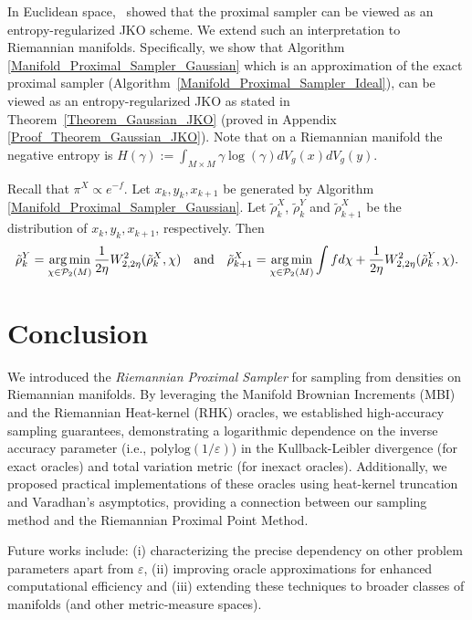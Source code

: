 In Euclidean space,~\cite{chen2022improved} showed that the proximal sampler can be viewed as an entropy-regularized JKO scheme.
We extend such an interpretation to Riemannian manifolds. Specifically, we show that Algorithm \ref{Manifold_Proximal_Sampler_Gaussian} which is an approximation of the exact proximal sampler (Algorithm~\ref{Manifold_Proximal_Sampler_Ideal}), can be viewed as an entropy-regularized JKO as stated in Theorem~\ref{Theorem_Gaussian_JKO} (proved in Appendix \ref{Proof_Theorem_Gaussian_JKO}). Note that on a Riemannian manifold the negative entropy is $H(\gamma) := \int_{M \times M} \gamma \log(\gamma) dV_{g}(x) dV_{g}(y) $.
\begin{theorem}\label{Theorem_Gaussian_JKO}
    Recall that $\pi^{X} \propto e^{-f}$.
    Let $x_{k}, y_{k}, x_{k+1}$ be generated by Algorithm \ref{Manifold_Proximal_Sampler_Gaussian}. 
    Let $\tilde{\rho}_{k}^{X}$, $\tilde{\rho}_{k}^{Y}$ and $\tilde{\rho}_{k+1}^{X}$ be the distribution of $x_{k}, y_{k}, x_{k+1}$, respectively. 
    Then  
    \begin{align*}
            \tilde{\rho}_{k}^{Y} = \operatorname*{arg\,min}_{\chi \in \mathcal{P}_{2}(M)} \frac{1}{2\eta} W_{2, 2\eta}^{2}(\tilde{\rho}_{k}^{X}, \chi) \quad\text{and}\quad
            \tilde{\rho}_{k+1}^{X} = \operatorname*{arg\,min}_{\chi \in \mathcal{P}_{2}(M)} \int f d\chi + \frac{1}{2\eta} W_{2, 2\eta}^{2}(\tilde{\rho}_{k}^{Y}, \chi).
    \end{align*}
\end{theorem}


\section{Conclusion}

We introduced the \textit{Riemannian Proximal Sampler} for sampling from densities on Riemannian manifolds. By leveraging the Manifold Brownian Increments (MBI) and the Riemannian Heat-kernel (RHK) oracles, we established high-accuracy sampling guarantees, demonstrating a logarithmic dependence on the inverse accuracy parameter (i.e., \(\text{polylog}(1/\varepsilon)\)) in the Kullback-Leibler divergence (for exact oracles) and total variation metric (for inexact oracles). Additionally, we proposed practical implementations of these oracles using heat-kernel truncation and Varadhan’s asymptotics, providing a connection between our sampling method and the Riemannian Proximal Point Method. 

Future works include: (i) characterizing the precise dependency on other problem parameters apart from $\varepsilon$, (ii) improving oracle approximations for enhanced computational efficiency and (iii) extending these techniques to broader classes of manifolds (and other metric-measure spaces). 
